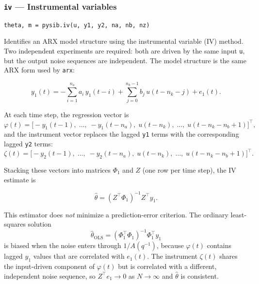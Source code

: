 \documentclass[../main]{subfiles}
\begin{document}
\newpage

\subsubsection{\texttt{iv} --- Instrumental variables}

\begin{lstlisting}
theta, m = pysib.iv(u, y1, y2, na, nb, nz)
\end{lstlisting}

Identifies an ARX model structure using the instrumental variable
(IV) method.  Two independent experiments are required: both are
driven by the same input \texttt{u}, but the output noise sequences
are independent.  The model structure is the same ARX form used by
\texttt{arx}:

\[
  y_1(t) = -\sum_{i=1}^{n_a} a_i\,y_1(t-i)
           + \sum_{j=0}^{n_b-1} b_j\,u(t - n_k - j)
           + e_1(t).
\]

At each time step, the regression vector is
\[
  \varphi(t) = \bigl[-y_1(t-1),\;\ldots,\;-y_1(t-n_a),\;
               u(t-n_k),\;\ldots,\;u(t-n_k-n_b+1)\bigr]^\top,
\]
and the instrument vector replaces the lagged \texttt{y1} terms with
the corresponding lagged \texttt{y2} terms:
\[
  \zeta(t) = \bigl[-y_2(t-1),\;\ldots,\;-y_2(t-n_a),\;
              u(t-n_k),\;\ldots,\;u(t-n_k-n_b+1)\bigr]^\top.
\]

Stacking these vectors into matrices $\Phi_1$ and $Z$ (one row per
time step), the IV estimate is

\[
  \hat{\theta} = (Z^\top \Phi_1)^{-1} Z^\top y_1.
\]

This estimator does \emph{not} minimize a prediction-error criterion.
The ordinary least-squares solution
\[
  \hat{\theta}_{\mathrm{OLS}} = (\Phi_1^\top\Phi_1)^{-1}\Phi_1^\top y_1
\]
is biased when the noise enters through $1/A(q^{-1})$, because
$\varphi(t)$ contains lagged $y_1$ values that are correlated with
$e_1(t)$.  The instrument $\zeta(t)$ shares the input-driven
component of $\varphi(t)$ but is correlated with a different,
independent noise sequence, so $Z^\top e_1 \to 0$ as
$N\to\infty$ and $\hat\theta$ is consistent.
\end{document}
